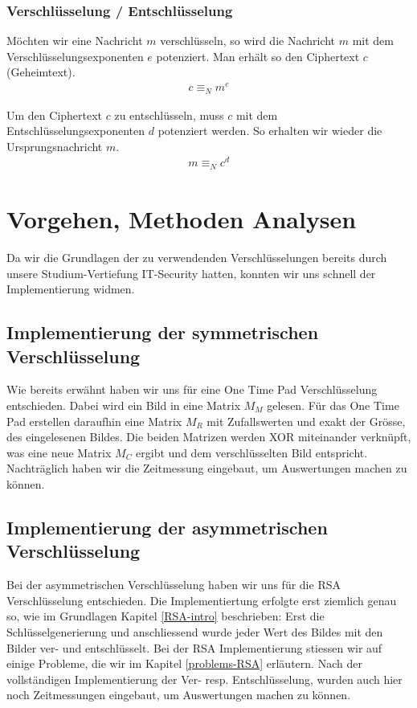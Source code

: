 \documentclass[paper=a4,fontsize=12pt]{scrartcl}
\begin{document}
\subsubsection{Verschlüsselung / Entschlüsselung}
Möchten wir eine Nachricht $m$ verschlüsseln, so wird die Nachricht $m$ mit dem Verschlüsselungsexponenten $e$ potenziert.
Man erhält so den Ciphertext $c$ (Geheimtext).
\begin{align}
	c \equiv_N m^e
\end{align}

Um den Ciphertext $c$ zu entschlüsseln, muss $c$ mit dem Entschlüsselungsexponenten $d$ potenziert werden.
So erhalten wir wieder die Ursprungsnachricht $m$.
\begin{align}
	m \equiv_N c^d
\end{align}

 

\newpage
\section{Vorgehen, Methoden Analysen}
Da wir die Grundlagen der zu verwendenden Verschlüsselungen bereits durch unsere Studium-Vertiefung IT-Security hatten,
konnten wir uns schnell der Implementierung widmen.

\subsection{Implementierung der symmetrischen Verschlüsselung}
Wie bereits erwähnt haben wir uns für eine One Time Pad Verschlüsselung entschieden.
Dabei wird ein Bild in eine Matrix $M_M$ gelesen. 
Für das One Time Pad erstellen daraufhin eine Matrix $M_R$ mit Zufallswerten und exakt der Grösse, des eingelesenen Bildes.
Die beiden Matrizen werden XOR miteinander verknüpft, was eine neue Matrix $M_C$ ergibt und dem verschlüsselten Bild entspricht.
Nachträglich haben wir die Zeitmessung eingebaut, um Auswertungen machen zu können.


\subsection{Implementierung der asymmetrischen Verschlüsselung}
Bei der asymmetrischen Verschlüsselung haben wir uns für die RSA Verschlüsselung entschieden.
Die Implementiertung erfolgte erst ziemlich genau so, wie im Grundlagen Kapitel \ref{RSA-intro} beschrieben:
Erst die Schlüsselgenerierung und anschliessend wurde jeder Wert des Bildes mit den Bilder ver- und entschlüsselt.
Bei der RSA Implementierung stiessen wir auf einige Probleme, die wir im Kapitel \ref{problems-RSA} erläutern.
Nach der vollständigen Implementierung der Ver- resp. Entschlüsselung, wurden auch hier noch Zeitmessungen eingebaut, um Auswertungen
machen zu können.
\end{document}
